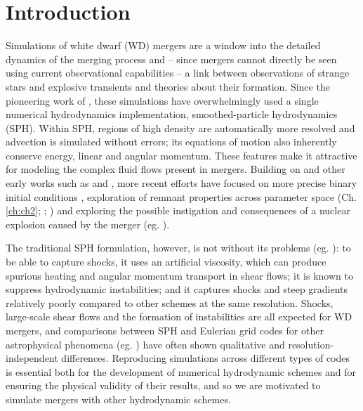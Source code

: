 \section{Introduction}
\label{sec:c3_intro}


Simulations of white dwarf (WD) mergers are a window into the detailed dynamics of the merging process and -- since mergers cannot directly be seen using current observational capabilities -- a link between observations of strange stars and explosive transients and theories about their formation.  Since the pioneering work of \cite{benz+90}, these simulations have overwhelmingly used a single numerical hydrodynamics implementation, smoothed-particle hydrodynamics (SPH).  Within SPH, regions of high density are automatically more resolved and advection is simulated without errors; its equations of motion also inherently conserve energy, linear and angular momentum.  These features make it attractive for modeling the complex fluid flows present in mergers.  Building on \citeauthor{benz+90} and other early works such as \cite{segrcm97} and \cite{guerig04}, more recent efforts have focused on more precise binary initial conditions \citep{dan+11}, exploration of remnant properties across parameter space (Ch. \ref{ch:ch2}; \citeal{loreig09}; \citealt{rask+12, dan+14}) and exploring the possible instigation and consequences of a nuclear explosion caused by the merger (eg. \citealt{pakm+10, dan+12, pakm+13, moll+14, rask+14}).

The traditional SPH formulation, however, is not without its problems (eg. \citealt{spri10,hopk15}): to be able to capture shocks, it uses an artificial viscosity, which can produce spurious heating and angular momentum transport in shear flows; it is known to suppress hydrodynamic instabilities; and it captures shocks and steep gradients relatively poorly compared to other schemes at the same resolution.  Shocks, large-scale shear flows and the formation of instabilities are all expected for WD mergers, and comparisons between SPH and Eulerian grid codes for other astrophysical phenomena (eg. \citealt{dval+06, tracsp07, mitc+09}) have often shown qualitative and resolution-independent differences.  Reproducing simulations across different types of codes is essential both for the development of numerical hydrodynamic schemes and for ensuring the physical validity of their results, and so we are motivated to simulate mergers with other hydrodynamic schemes.


